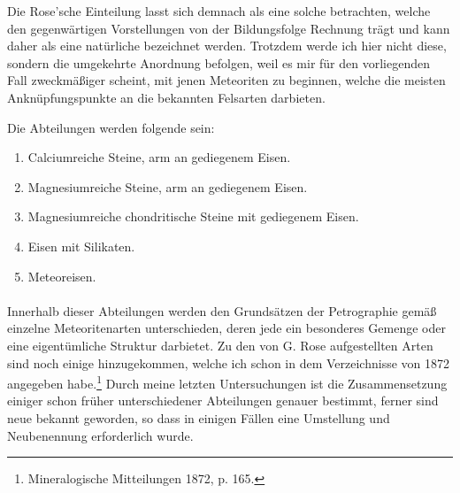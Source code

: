\documentclass[a4paper, 11pt, oneside, polutonikogreek, german]{article}
\begin{document}
Die Rose'sche Einteilung lasst sich demnach als eine solche betrachten, welche den gegenwärtigen Vorstellungen von der Bildungsfolge Rechnung trägt und kann daher als eine natürliche bezeichnet werden. Trotzdem werde ich hier nicht diese, sondern die umgekehrte Anordnung befolgen, weil es mir für den vorliegenden Fall zweckmäßiger scheint, mit jenen Meteoriten zu beginnen, welche die meisten Anknüpfungspunkte an die bekannten Felsarten darbieten.

Die Abteilungen werden folgende sein:
\begin{enumerate}
    \item Calciumreiche Steine, arm an gediegenem Eisen.  
    \item Magnesiumreiche Steine, arm an gediegenem Eisen.  
    \item Magnesiumreiche chondritische Steine mit gediegenem Eisen.  
    \item Eisen mit Silikaten.  
    \item Meteoreisen.
\end{enumerate}
\paragraph*{}
Innerhalb dieser Abteilungen werden den Grundsätzen der Petrographie gemäß einzelne Meteoritenarten unterschieden, deren jede ein besonderes Gemenge oder eine eigentümliche Struktur darbietet. Zu den von G. Rose aufgestellten Arten sind noch einige hinzugekommen, welche ich schon in dem Verzeichnisse von 1872 angegeben habe.\footnote{Mineralogische Mitteilungen 1872, p. 165.} Durch meine letzten Untersuchungen ist die Zusammensetzung einiger schon früher unterschiedener Abteilungen genauer bestimmt, ferner sind neue bekannt geworden, so dass in einigen Fällen eine Umstellung und Neubenennung erforderlich wurde.
\end{document}
